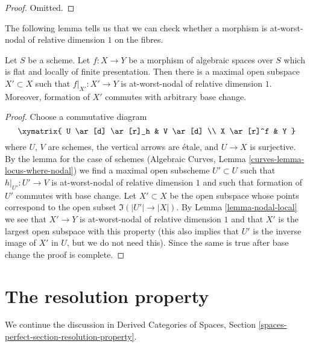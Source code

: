\begin{proof}
Omitted.
\end{proof}

\noindent
The following lemma tells us that we can check whether a morphism
is at-worst-nodal of relative dimension $1$ on the fibres.

\begin{lemma}
\label{lemma-locus-where-nodal}
Let $S$ be a scheme.
Let $f : X \to Y$ be a morphism of algebraic spaces over $S$
which is flat and locally of finite presentation. Then there
is a maximal open subspace $X' \subset X$ such that $f|_{X'} : X' \to Y$
is at-worst-nodal of relative dimension $1$. Moreover, formation
of $X'$ commutes with arbitrary base change.
\end{lemma}

\begin{proof}
Choose a commutative diagram
$$
\xymatrix{
U \ar[d] \ar[r]_h & V \ar[d] \\
X \ar[r]^f & Y
}
$$
where $U$, $V$ are schemes, the vertical arrows are \'etale, and
$U \to X$ is surjective. By the lemma for the case of schemes
(Algebraic Curves, Lemma \ref{curves-lemma-locus-where-nodal})
we find a maximal open subscheme $U' \subset U$
such that $h|_{U'} : U' \to V$ is at-worst-nodal of relative dimension $1$
and such that formation of $U'$ commutes with base change.
Let $X' \subset X$ be the open subspace whose points correspond
to the open subset $\Im(|U'| \to |X|)$.
By Lemma \ref{lemma-nodal-local} we see that $X' \to Y$ is
at-worst-nodal of relative dimension $1$ and that $X'$ is the
largest open subspace with this property (this also implies
that $U'$ is the inverse image of $X'$ in $U$, but we do
not need this). Since the same is true after base change
the proof is complete.
\end{proof}




\section{The resolution property}
\label{section-resolution-property}

\noindent
We continue the discussion in Derived Categories of Spaces, Section
\ref{spaces-perfect-section-resolution-property}.


